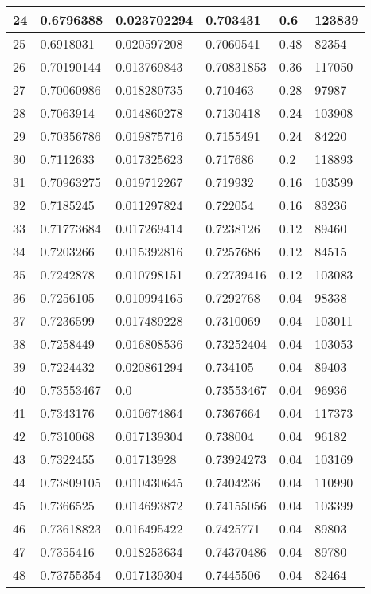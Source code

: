 \begin{longtable}{|l|l|l|l|l|l|}
24 & 0.6796388 & 0.023702294 & 0.703431 & 0.6 & 123839 \\ \hline 
25 & 0.6918031 & 0.020597208 & 0.7060541 & 0.48 & 82354 \\ \hline 
26 & 0.70190144 & 0.013769843 & 0.70831853 & 0.36 & 117050 \\ \hline 
27 & 0.70060986 & 0.018280735 & 0.710463 & 0.28 & 97987 \\ \hline 
28 & 0.7063914 & 0.014860278 & 0.7130418 & 0.24 & 103908 \\ \hline 
29 & 0.70356786 & 0.019875716 & 0.7155491 & 0.24 & 84220 \\ \hline 
30 & 0.7112633 & 0.017325623 & 0.717686 & 0.2 & 118893 \\ \hline 
31 & 0.70963275 & 0.019712267 & 0.719932 & 0.16 & 103599 \\ \hline 
32 & 0.7185245 & 0.011297824 & 0.722054 & 0.16 & 83236 \\ \hline 
33 & 0.71773684 & 0.017269414 & 0.7238126 & 0.12 & 89460 \\ \hline 
34 & 0.7203266 & 0.015392816 & 0.7257686 & 0.12 & 84515 \\ \hline 
35 & 0.7242878 & 0.010798151 & 0.72739416 & 0.12 & 103083 \\ \hline 
36 & 0.7256105 & 0.010994165 & 0.7292768 & 0.04 & 98338 \\ \hline 
37 & 0.7236599 & 0.017489228 & 0.7310069 & 0.04 & 103011 \\ \hline 
38 & 0.7258449 & 0.016808536 & 0.73252404 & 0.04 & 103053 \\ \hline 
39 & 0.7224432 & 0.020861294 & 0.734105 & 0.04 & 89403 \\ \hline 
40 & 0.73553467 & 0.0 & 0.73553467 & 0.04 & 96936 \\ \hline 
41 & 0.7343176 & 0.010674864 & 0.7367664 & 0.04 & 117373 \\ \hline 
42 & 0.7310068 & 0.017139304 & 0.738004 & 0.04 & 96182 \\ \hline 
43 & 0.7322455 & 0.01713928 & 0.73924273 & 0.04 & 103169 \\ \hline 
44 & 0.73809105 & 0.010430645 & 0.7404236 & 0.04 & 110990 \\ \hline 
45 & 0.7366525 & 0.014693872 & 0.74155056 & 0.04 & 103399 \\ \hline 
46 & 0.73618823 & 0.016495422 & 0.7425771 & 0.04 & 89803 \\ \hline 
47 & 0.7355416 & 0.018253634 & 0.74370486 & 0.04 & 89780 \\ \hline 
48 & 0.73755354 & 0.017139304 & 0.7445506 & 0.04 & 82464 \\ \hline 

\end{longtable}
